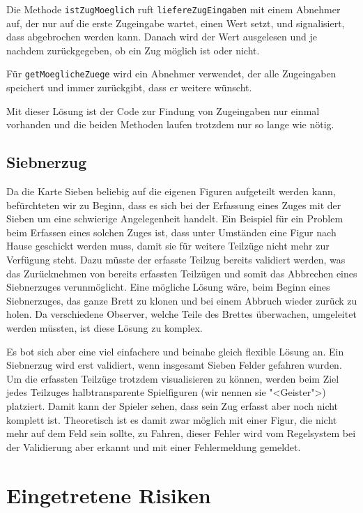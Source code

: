 \documentclass[12pt,halfparskip]{scrartcl}
\begin{document}
Die Methode \texttt{istZugMoeglich} ruft \texttt{liefereZugEingaben} mit einem Abnehmer auf, der nur auf die erste Zugeingabe wartet, einen Wert setzt, und signalisiert, dass abgebrochen werden kann. Danach wird der Wert ausgelesen und je nachdem zurückgegeben, ob ein Zug möglich ist oder nicht.

Für \texttt{getMoeglicheZuege} wird ein Abnehmer verwendet, der alle Zugeingaben speichert und immer zurückgibt, dass er weitere wünscht.

Mit dieser Lösung ist der Code zur Findung von Zugeingaben nur einmal vorhanden und die beiden Methoden laufen trotzdem nur so lange wie nötig.

\subsection{Siebnerzug}

Da die Karte Sieben beliebig auf die eigenen Figuren aufgeteilt werden kann, befürchteten wir zu Beginn, dass es sich bei der Erfassung eines Zuges mit der Sieben um eine schwierige Angelegenheit handelt. Ein Beispiel für ein Problem beim Erfassen eines solchen Zuges ist, dass unter Umständen eine Figur nach Hause geschickt werden muss, damit sie für weitere Teilzüge nicht mehr zur Verfügung steht. Dazu müsste der erfasste Teilzug bereits validiert werden, was das Zurücknehmen von bereits erfassten Teilzügen und somit das Abbrechen eines Siebnerzuges verunmöglicht. Eine mögliche Lösung wäre, beim Beginn eines Siebnerzuges, das ganze Brett zu klonen und bei einem Abbruch wieder zurück zu holen. Da verschiedene Observer, welche Teile des Brettes überwachen, umgeleitet werden müssten, ist diese Lösung zu komplex.

Es bot sich aber eine viel einfachere und beinahe gleich flexible Lösung an. Ein Siebnerzug wird erst validiert, wenn insgesamt Sieben Felder gefahren wurden. Um die erfassten Teilzüge trotzdem visualisieren zu können, werden beim Ziel jedes Teilzuges halbtransparente Spielfiguren (wir nennen sie "<Geister">) platziert. Damit kann der Spieler sehen, dass sein Zug erfasst aber noch nicht komplett ist. Theoretisch ist es damit zwar möglich mit einer Figur, die nicht mehr auf dem Feld sein sollte, zu Fahren, dieser Fehler wird vom Regelsystem bei der Validierung aber erkannt und mit einer Fehlermeldung gemeldet.

\clearpage
\section{Eingetretene Risiken}
\label{eingetretene_risiken}
\end{document}
